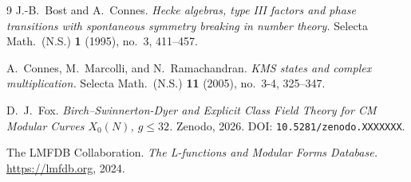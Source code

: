 \documentclass[11pt]{article}
\begin{document}
\small
\begin{thebibliography}{9}
J.-B.\ Bost and A.\ Connes.
\emph{Hecke algebras, type III factors and phase transitions with
spontaneous symmetry breaking in number theory.}
Selecta Math.\ (N.S.) \textbf{1} (1995), no.~3, 411--457.

A.\ Connes, M.\ Marcolli, and N.\ Ramachandran.
\emph{KMS states and complex multiplication.}
Selecta Math.\ (N.S.) \textbf{11} (2005), no.~3-4, 325--347.

D.\ J.\ Fox.
\emph{Birch--Swinnerton-Dyer and Explicit Class Field Theory for CM
Modular Curves $X_0(N)$, $g \le 32$.} Zenodo, 2026.
DOI: \texttt{10.5281/zenodo.XXXXXXX}.

The LMFDB Collaboration.
\emph{The L-functions and Modular Forms Database.}
\url{https://lmfdb.org}, 2024.
\end{thebibliography}
\end{document}
